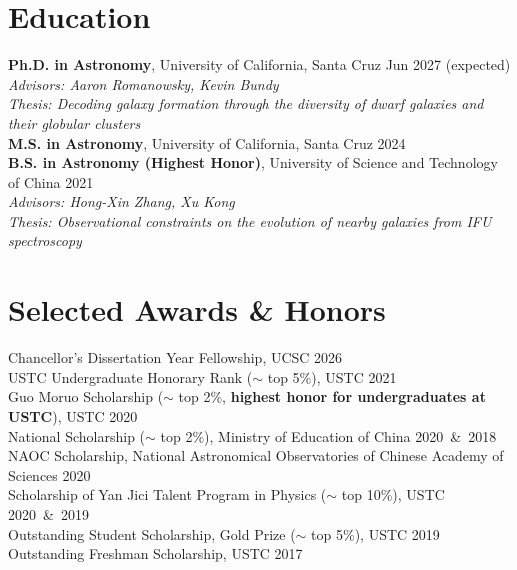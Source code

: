 \documentclass[letterpaper,11pt]{article}
\begin{document}
\section{Education}
  {{\bf Ph.D. in Astronomy}, University of California, Santa Cruz} \hfill {Jun 2027 (expected)}\\
  \vspace{0.05cm}
  \hspace{0.3cm} {\em Advisors: Aaron Romanowsky, Kevin Bundy}\\
  \hspace{0.3cm} {\em Thesis:  Decoding galaxy formation through the diversity of dwarf galaxies and their globular clusters}\\
  \vspace{0.2cm}
  {{\bf M.S. in Astronomy}, University of California, Santa Cruz} \hfill {2024}\\
  \vspace{0.2cm}
  {{\bf B.S. in Astronomy (Highest Honor)}, University of Science and Technology of China} \hfill {2021}\\
  \vspace{0.05cm}
  \hspace{0.3cm} {\em Advisors: Hong-Xin Zhang, Xu Kong}\\
  \hspace{0.3cm} {\em Thesis: Observational constraints on the evolution of nearby galaxies from IFU spectroscopy}\\

\section{Selected Awards \& Honors}
  Chancellor's Dissertation Year Fellowship, {\small UCSC} \hfill{2026}\\
  USTC Undergraduate Honorary Rank {\small($\sim$ top 5\%)}, {\small USTC} \hfill{2021}\\
  \vspace{0.03cm}Guo Moruo Scholarship {\small($\sim$ top 2\%, {\bf highest honor for undergraduates at USTC})}, {\small USTC} \hfill{2020}\vspace{0.03cm}\\ 
  \vspace{0.03cm}National Scholarship {\small($\sim$ top 2\%)}, {\small Ministry of Education of China} \hfill{2020~{\footnotesize\&}~2018}\\ 
  \vspace{0.03cm}NAOC Scholarship, {\small National Astronomical Observatories of Chinese Academy of Sciences} \hfill{2020}\\
  \vspace{0.03cm}Scholarship of Yan Jici Talent Program in Physics {\small($\sim$ top 10\%)}, {\small USTC} \hfill{2020~{\footnotesize\&}~2019}\\ 
  \vspace{0.03cm}Outstanding Student Scholarship, Gold Prize {\small($\sim$ top 5\%)}, {\small USTC} \hfill{2019}\\ 
  \vspace{0.03cm}Outstanding Freshman Scholarship, {\small USTC} \hfill{2017}
\end{document}
